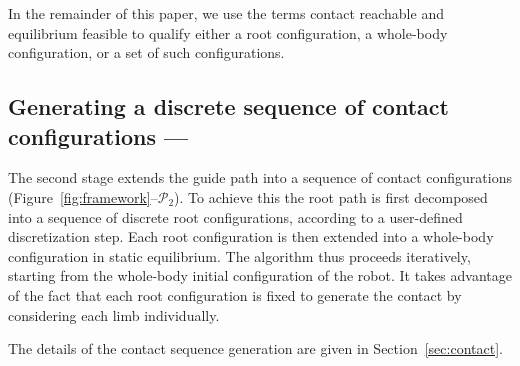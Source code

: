 
In the remainder of this paper, we use the terms \gls{contact reachable} and \gls{equilibrium feasible} to qualify either a root configuration, a whole-body configuration, or a set
of such configurations.


\subsection{Generating a discrete sequence of contact configurations --- \Pb}
The second stage extends the guide path into a sequence of contact configurations (Figure~\ref{fig:framework}--$\mathcal{P}_2$).
To achieve this the root path is first decomposed into a sequence of discrete root configurations, according to a user-defined discretization step.
Each root configuration is then extended into a whole-body configuration in static equilibrium.
The algorithm thus proceeds iteratively, starting from the whole-body initial configuration of the robot.
It takes advantage of the fact that each root configuration is fixed to generate the contact by considering each limb individually. 

The details of the contact sequence generation are given in Section~\ref{sec:contact}. 



